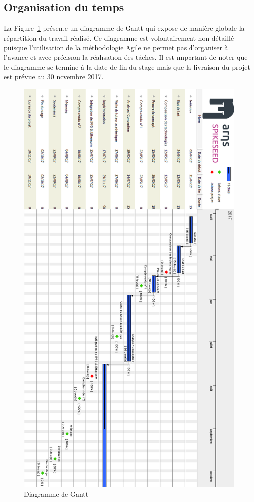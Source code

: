 \documentclass{tnreport}
\begin{document}
\subsection{Organisation du temps}

La Figure~\ref{fig:gantt} présente un diagramme de Gantt qui expose de manière globale la répartition du travail réalisé. Ce diagramme est volontairement non détaillé puisque l'utilisation de la méthodologie Agile ne permet pas d'organiser à l'avance et avec précision la réalisation des tâches. Il est important de noter que le diagramme se termine à la date de fin du stage mais que la livraison du projet est prévue au 30 novembre 2017.

\begin{figure}[h]
	\centering
	\includegraphics[scale=0.67]{figures/gantt-stage-vertical}
	\caption{Diagramme de Gantt}
	\label{fig:gantt}
\end{figure}
\end{document}
